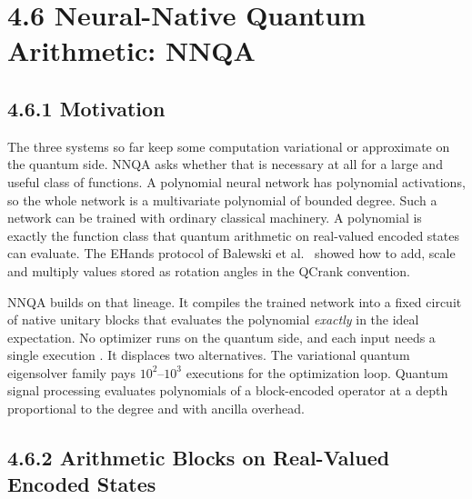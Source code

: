 \documentclass{report}
\theoremstyle{plain}
\theoremstyle{definition}
\theoremstyle{remark}
\begin{document}
\section{4.6 Neural-Native Quantum Arithmetic: NNQA}\label{sec:qml:nnqa}

\subsection{4.6.1 Motivation}\label{sec:qml:nnqa:motivation}

The three systems so far keep some computation variational or approximate on the quantum side. NNQA asks whether that is necessary at all for a large and useful class of functions. A polynomial neural network has polynomial activations, so the whole network is a multivariate polynomial of bounded degree. Such a network can be trained with ordinary classical machinery. A polynomial is exactly the function class that quantum arithmetic on real-valued encoded states can evaluate. The EHands protocol of Balewski et al.~\cite{balewski2025ehands} showed how to add, scale and multiply values stored as rotation angles in the QCrank convention.

NNQA builds on that lineage. It compiles the trained network into a fixed circuit of native unitary blocks that evaluates the polynomial \emph{exactly} in the ideal expectation. No optimizer runs on the quantum side, and each input needs a single execution \cite{guo2026nnqa}. It displaces two alternatives. The variational quantum eigensolver family \cite{peruzzo2014vqe,cerezo2021vqa} pays $10^2$--$10^3$ executions for the optimization loop. Quantum signal processing \cite{low2017qsp,gilyen2019qsvt} evaluates polynomials of a block-encoded operator at a depth proportional to the degree and with ancilla overhead.

\subsection{4.6.2 Arithmetic Blocks on Real-Valued Encoded States}\label{sec:qml:nnqa:blocks}
\end{document}
